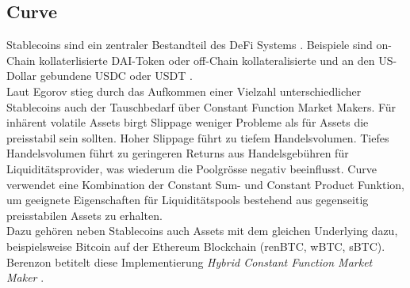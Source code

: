 \documentclass[12pt,a4paper,titlepage,oneside,english]{article}
\begin{document}

\subsection{Curve}
Stablecoins sind ein zentraler Bestandteil des DeFi Systems \citep[S.1]{Egorov2019}. Beispiele sind on-Chain kollaterlisierte DAI-Token oder off-Chain kollateralisierte und an den US-Dollar gebundene USDC oder USDT \citep[S.6]{Schaer2020}. \\ 
Laut Egorov stieg durch das Aufkommen einer Vielzahl unterschiedlicher Stablecoins auch der Tauschbedarf über Constant Function Market Makers. Für inhärent volatile Assets %
birgt Slippage weniger Probleme als für Assets die preisstabil sein sollten.  Hoher Slippage führt zu tiefem Handelsvolumen. Tiefes Handelsvolumen führt zu geringeren Returns aus Handelsgebühren für Liquiditätsprovider, was wiederum die Poolgrösse negativ beeinflusst. Curve verwendet eine Kombination der Constant Sum- und Constant Product Funktion, um geeignete Eigenschaften für Liquiditätspools bestehend aus gegenseitig preisstabilen Assets zu erhalten. \citep[vgl.][S.1]{Egorov2019} \\ Dazu gehören neben Stablecoins auch Assets mit dem gleichen Underlying dazu, beispielsweise Bitcoin auf der Ethereum Blockchain (renBTC, wBTC, sBTC).
Berenzon betitelt diese Implementierung \textit{Hybrid Constant Function Market Maker} \citep{Berenzon2020}.
\end{document}

